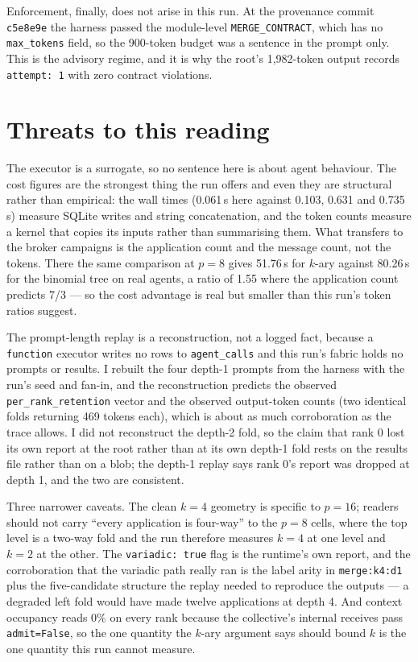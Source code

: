 \documentclass[11pt]{article}
\begin{document}
Enforcement, finally, does not arise in this run. At the provenance commit \texttt{c5e8e9e}
the harness passed the module-level \texttt{MERGE\_CONTRACT}, which has no
\texttt{max\_tokens} field, so the 900-token budget was a sentence in the prompt only. This
is the advisory regime, and it is why the root's 1{,}982-token output records
\texttt{attempt: 1} with zero contract violations.

\section{Threats to this reading}

The executor is a surrogate, so no sentence here is about agent behaviour. The cost figures
are the strongest thing the run offers and even they are structural rather than empirical:
the wall times (0.061\,s here against 0.103, 0.631 and 0.735\,s) measure SQLite writes and
string concatenation, and the token counts measure a kernel that copies its inputs rather
than summarising them. What transfers to the broker campaigns is the application count and
the message count, not the tokens. There the same comparison at $p=8$ gives 51.76\,s for
$k$-ary against 80.26\,s for the binomial tree on real agents, a ratio of 1.55 where the
application count predicts 7/3 --- so the cost advantage is real but smaller than this run's
token ratios suggest.

The prompt-length replay is a reconstruction, not a logged fact, because a
\texttt{function} executor writes no rows to \texttt{agent\_calls} and this run's fabric
holds no prompts or results. I rebuilt the four depth-1 prompts from the harness with the
run's seed and fan-in, and the reconstruction predicts the observed
\texttt{per\_rank\_retention} vector and the observed output-token counts (two identical
folds returning 469 tokens each), which is about as much corroboration as the trace allows.
I did not reconstruct the depth-2 fold, so the claim that rank 0 lost its own report at the
root rather than at its own depth-1 fold rests on the results file rather than on a blob;
the depth-1 replay says rank 0's report was dropped at depth 1, and the two are consistent.

Three narrower caveats. The clean $k=4$ geometry is specific to $p=16$; readers should not
carry ``every application is four-way'' to the $p=8$ cells, where the top level is a two-way
fold and the run therefore measures $k=4$ at one level and $k=2$ at the other. The
\texttt{variadic: true} flag is the runtime's own report, and the corroboration that the
variadic path really ran is the label arity in \texttt{merge:k4:d1} plus the five-candidate
structure the replay needed to reproduce the outputs --- a degraded left fold would have
made twelve applications at depth 4. And context occupancy reads 0\% on every rank because
the collective's internal receives pass \texttt{admit=False}, so the one quantity the
$k$-ary argument says should bound $k$ is the one quantity this run cannot measure.
\end{document}
